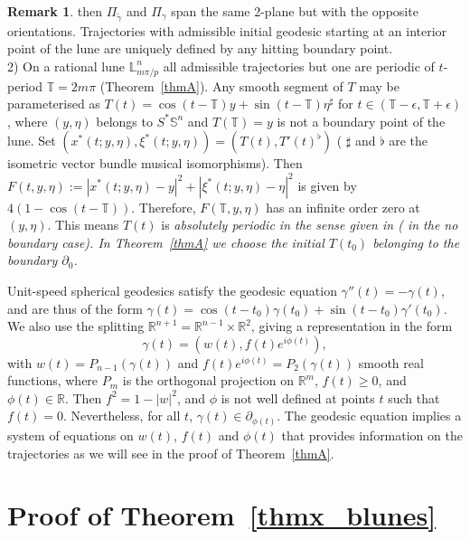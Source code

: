 \documentclass[11pt,a4paper,times]{amsart}
\theoremstyle{plain}
\theoremstyle{definition}
\newtheorem{remark}{Remark}[section]
\numberwithin{equation}{section}
\newcommand{\R}{\mathbb{R}}
\newcommand{\lune}[2]{\mathbb{L}^{#1}_{#2}}
\begin{document}
\begin{remark}
{ then $\Pi_{\tilde{\gamma}}$ and $\Pi_{\gamma}$ span the same 2-plane but with the opposite orientations. Trajectories with admissible initial geodesic
 starting at an interior point of the lune are uniquely defined by any  hitting boundary point. }\\[1mm]
 2) On a rational lune $\lune{n}{m \pi/p}$ all admissible trajectories but one
  are periodic  of $t$-period $\mathbb{T}=2m\pi $  (Theorem~\ref{thmA}).
Any smooth segment of $T$  may be parameterised as  $T(t)=\cos(t-\mathbb{T})y+\sin(t-\mathbb{T})\eta^{\sharp} $ for $t\in (\mathbb{T}-\epsilon, \mathbb{T}+\epsilon)$, 
where $(y, \eta)$ belongs to $S^*\mathbb{S}^n$
and $T(\mathbb{T})=y$ is not a boundary point of the lune. Set $(x^*(t; y,\eta),\xi^*(t;y, \eta))
=(T(t),T'(t)^{\flat})$ ( $\sharp$ and $\flat$ are the isometric vector bundle  musical isomorphisms). Then $ F(t,y, \eta):=|x^*(t; y,\eta)-y|^2 + |\xi^*(t;y,\eta)-\eta|^2$
is given by $ 4(1-\cos(t-\mathbb{T}))$.   Therefore,  $F(\mathbb{T},y,\eta)$ has an infinite order zero at $(y,\eta)$.
This means  $T(t)$ is \em absolutely periodic \em in the sense given in \cite[pag.\ 229]{va} (\cite[Definition 1.3.2.]{sava} in the no boundary case).
In Theorem~\ref{thmA} we choose the initial $T(t_0)$ belonging to the boundary $\partial_0$.
\end{remark} 
Unit-speed spherical geodesics satisfy the geodesic equation $\gamma''(t)=-\gamma(t)$,  and
are thus of the form  $\gamma(t)=\cos(t-t_0)\gamma(t_0)+\sin(t-t_0)\gamma'(t_0)$.
We {also} use the splitting $\R^{n+1}= \R^{n-1}\times \R^2$, giving a representation in the form
\begin{equation}\label{representation}
\gamma(t)=(w(t), f(t)e^{i\phi(t)}),
\end{equation}
with $w(t)=P_{n-1}(\gamma(t))$ and $f(t)e^{i\phi(t)}=P_2(\gamma(t))$ smooth real functions, where $P_m$ is the orthogonal projection on $\R^m$, $f(t)\geq 0$, and  $\phi(t)\in \R$. Then $f^2= 1-|w|^2$, and $\phi$ is not well defined at points $t$ such that $f(t)=0$.
Nevertheless, for all $t$, $\gamma(t)\in {\partial_{\phi(t)}}$. The geodesic equation implies a system of equations on $w(t)$, $f(t)$ and $\phi(t)$ that provides information on the trajectories as we will see in the proof of Theorem~\ref{thmA}.


\section{Proof of Theorem~\ref{thmx_blunes}}\label{proofbill}
\end{document}
